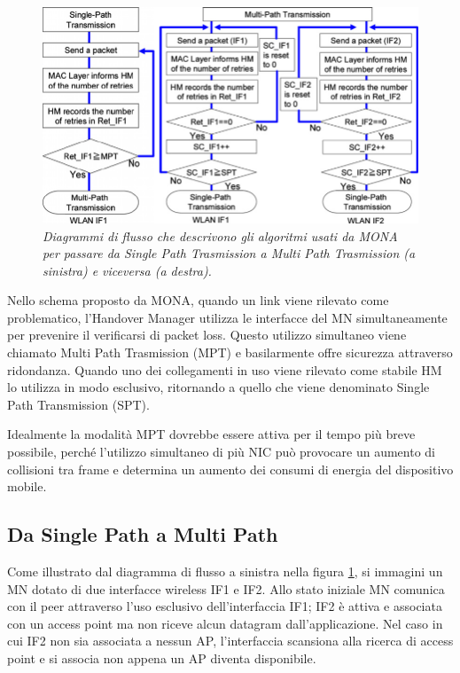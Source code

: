 \documentclass[12pt,a4paper,openright,twoside,draft]{book}
\begin{document}
\begin{figure}
  \centering
  \includegraphics[width=12cm]{img/mona-sp-mp}
  \caption{\em Diagrammi di flusso che descrivono gli algoritmi usati da
    MONA per passare da Single Path Trasmission a Multi Path Trasmission
    (a sinistra) e viceversa (a destra).}
  \label{fig:mona:sp-mp}
\end{figure}

Nello schema proposto da MONA, quando un link viene rilevato come
problematico, l'Handover Manager utilizza le interfacce del MN
simultaneamente per prevenire il verificarsi di packet loss. Questo
utilizzo simultaneo viene chiamato Multi Path Trasmission (MPT) e
basilarmente offre sicurezza attraverso ridondanza. Quando uno dei
collegamenti in uso viene rilevato come stabile HM lo utilizza in modo
esclusivo, ritornando a quello che viene denominato Single Path
Transmission (SPT).

Idealmente la modalità MPT dovrebbe essere attiva
per il tempo più breve possibile, perché l'utilizzo simultaneo di più
NIC può provocare un aumento di collisioni tra frame e determina un
aumento dei consumi di energia del dispositivo mobile.

\subsection{Da Single Path a Multi Path}

Come illustrato dal diagramma di flusso a sinistra nella figura
\ref{fig:mona:sp-mp}, si immagini un MN dotato di due interfacce
wireless IF1 e IF2. Allo stato iniziale MN comunica con il peer
attraverso l'uso esclusivo dell'interfaccia IF1; IF2 è attiva e
associata con un access point ma non riceve alcun datagram
dall'applicazione. Nel caso in cui IF2 non sia associata a nessun AP,
l'interfaccia scansiona alla ricerca di access point e si associa non
appena un AP diventa disponibile.
\end{document}
